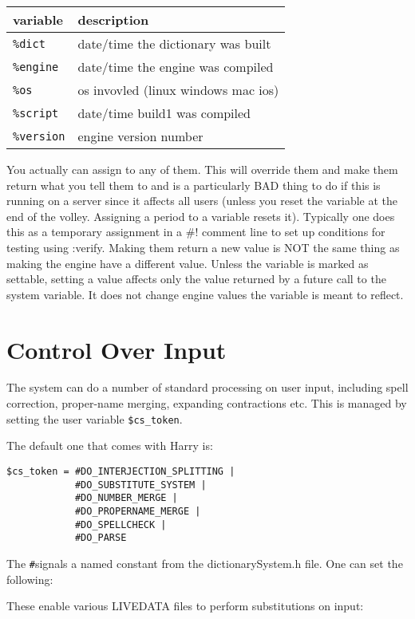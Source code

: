 \documentclass[]{article}
\begin{document}
\begin{longtable}[]{@{}ll@{}}
\toprule
variable & description\tabularnewline
\midrule
\endhead
\texttt{\%dict} & date/time the dictionary was built\tabularnewline
\texttt{\%engine} & date/time the engine was compiled\tabularnewline
\texttt{\%os} & os invovled (linux windows mac ios)\tabularnewline
\texttt{\%script} & date/time build1 was compiled\tabularnewline
\texttt{\%version} & engine version number\tabularnewline
\bottomrule
\end{longtable}

You actually can assign to any of them. This will override them and make
them return what you tell them to and is a particularly BAD thing to do
if this is running on a server since it affects all users (unless you
reset the variable at the end of the volley. Assigning a period to a
variable resets it). Typically one does this as a temporary assignment
in a \#! comment line to set up conditions for testing using :verify.
Making them return a new value is NOT the same thing as making the
engine have a different value. Unless the variable is marked as
settable, setting a value affects only the value returned by a future
call to the system variable. It does not change engine values the
variable is meant to reflect.

\section{Control Over Input}\label{control-over-input}

The system can do a number of standard processing on user input,
including spell correction, proper-name merging, expanding contractions
etc. This is managed by setting the user variable \texttt{\$cs\_token}.

The default one that comes with Harry is:

\begin{verbatim}
$cs_token = #DO_INTERJECTION_SPLITTING | 
            #DO_SUBSTITUTE_SYSTEM |
            #DO_NUMBER_MERGE | 
            #DO_PROPERNAME_MERGE | 
            #DO_SPELLCHECK |
            #DO_PARSE
\end{verbatim}

The \texttt{\#}signals a named constant from the dictionarySystem.h
file. One can set the following:

These enable various LIVEDATA files to perform substitutions on input:
\end{document}
